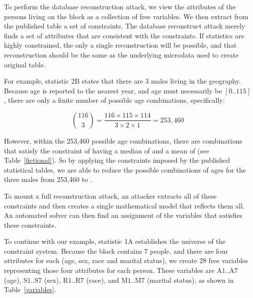 \documentclass[runningheads]{llncs}
\begin{document}
To perform the database reconstruction attack, we view the attributes
of the persons living on the block as a collection of 
free variables. We then extract from the published table a set of
constraints. The database reconstruct attack merely finds a set of
attributes that are consistent with the constraints. If statistics are
highly constrained, the only a single reconstruction will be
possible, and that reconstruction should be the same as the underlying
microdata used to create original table.

For example, statistic 2B states that there are 3 males living in the
geography.  Because age is reported to the nearest year, and
age must necessarily be $[ 0 .. 115]$, there
are only a finite number of possible age combinations, specifically:

\[ \binom{116}{3}=\frac{116 \times 115 \times 114}{3 \times 2 \times
  1} = 253,460 \]


However, within the 253,460 possible age combinations, there are \mycount{} combinations that satisfy the
constraint of having a median of \mymedian{} and a mean of \mymean{}
(see Table~\ref{fictional}). So by applying the constraints imposed by the
published statistical tables, we are able to reduce the possible
combinations of ages for the three males from 253,460 to \mycount.

To mount a full reconstruction attack, an attacker extracts all of these
constraints and then creates a
single mathematical model that reflects them all. An automated solver can then
find an assignment of the variables that satisfies these constraints. 

To continue with our example, statistic 1A establishes the universe of
the constraint system. Because the block contains 7 people, and there
are four attributes for each (age, sex, race and marital status), we
create 28 free variables representing those four attributes for each
person. These variables are $\textrm{A}1..\textrm{A}7$ (age),
$\textrm{S}1..\textrm{S}7$ (sex), $\textrm{R}1..\textrm{R}7$ (race),
and $\textrm{M}1..\textrm{M}7$ (marital status), as shown in
Table~\ref{variables}.
\end{document}
